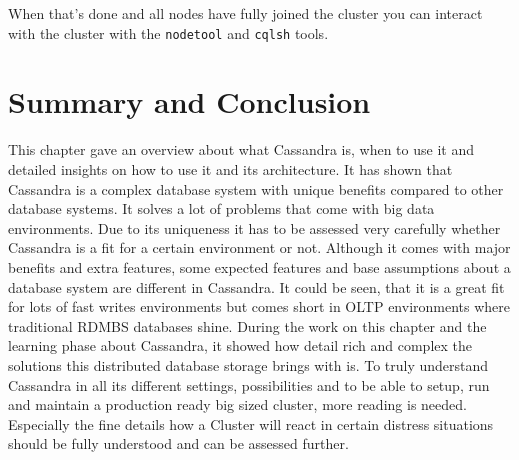 When that's done and all nodes have fully joined the cluster you can interact with the cluster with the \texttt{nodetool} and \texttt{cqlsh} tools.

\section{Summary and Conclusion}

This chapter gave an overview about what Cassandra is, when to use it and detailed insights on how to use it and its architecture. It has shown that Cassandra is a complex database system with unique benefits compared to other database systems. It solves a lot of problems that come with big data environments. Due to its uniqueness it has to be assessed very carefully whether Cassandra is a fit for a certain environment or not. Although it comes with major benefits and extra features, some expected features and base assumptions about a database system are different in Cassandra.
It could be seen, that it is a great fit for lots of fast writes environments but comes short in OLTP environments where traditional RDMBS databases shine.
During the work on this chapter and the learning phase about Cassandra, it showed how detail rich and complex the solutions this distributed database storage brings with is. To truly understand Cassandra in all its different settings, possibilities and to be able to setup, run and maintain a production ready big sized cluster, more reading is needed. Especially the fine details how a Cluster will react in certain distress situations should be fully understood and can be assessed further.

\cite{cassandra_paper}
